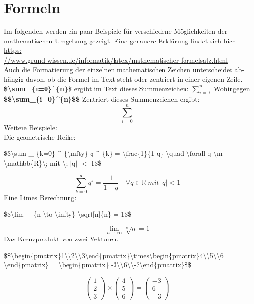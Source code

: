 \documentclass[a4paper, 12pt]{scrreprt}
\begin{document}
\section{Formeln}
Im folgenden werden ein paar Beispiele für verschiedene Möglichkeiten der mathematischen Umgebung gezeigt. Eine genauere Erklärung findet sich hier \href{https://www.grund-wissen.de/informatik/latex/mathematischer-formelsatz.html}{https:\\//www.grund-wissen.de/informatik/latex/mathematischer-formelsatz.html}\\
Auch die Formatierung der einzelnen mathematischen Zeichen unterscheidet ab-hängig davon, ob die Formel im Text steht oder zentriert in einer eigenen Zeile.\\
\textbf{\$\textbackslash sum\_\{i=0\}\^{}\{n\}\$} ergibt im Text dieses Summenzeichen: $\sum_{i=0}^{n}$ Wohingegen \textbf{\$\$\textbackslash sum\_\{i=0\}\^{}\{n\}\$\$} Zentriert dieses Summenzeichen ergibt:
$$\sum_{i=0}^{n}$$
\newpage
\noindent Weitere Beispiele:\\
Die geometrische Reihe:
\begin{addmargin}{0.5cm}
\$\$\textbackslash sum \_ \{k=0\} \^{} \{\textbackslash infty\} q \^{} \{k\} = \textbackslash frac\{1\}\{1-q\} \textbackslash quad \textbackslash forall q \textbackslash in \textbackslash mathbb\{R\}\textbackslash; mit \textbackslash; $|$q$|$ $<$ 1\$\$
\end{addmargin}\hfill
$$\sum_{k=0}^{\infty} q^{k} = \frac{1}{1-q} \quad \forall q \in \mathbb{R}\; mit\; |q| < 1$$
Eine Limes Berechnung:
\begin{addmargin}{0.5cm}
\$\$\textbackslash lim \_ \{n \textbackslash to \textbackslash infty\} \textbackslash sqrt[n]\{n\} = 1\$\$
\end{addmargin}\hfill
$$\lim_{n \to \infty} \sqrt[n]{n} = 1$$ 
Das Kreuzprodukt von zwei Vektoren:
\begin{addmargin}{0.5cm}
\$\$\textbackslash begin\{pmatrix\}1\textbackslash\textbackslash2\textbackslash\textbackslash3\textbackslash end\{pmatrix\}\textbackslash times\textbackslash begin\{pmatrix\}4\textbackslash\textbackslash 5\textbackslash\textbackslash 6\\\textbackslash end\{pmatrix\} = \textbackslash begin\{pmatrix\} -3\textbackslash\textbackslash 6\textbackslash\textbackslash -3\textbackslash end\{pmatrix\}\$\$
\end{addmargin}\hfill
$$\begin{pmatrix}1\\2\\3\end{pmatrix}\times\begin{pmatrix}4\\5\\6\end{pmatrix} = \begin{pmatrix}
-3\\6\\-3
\end{pmatrix}$$
\end{document}
